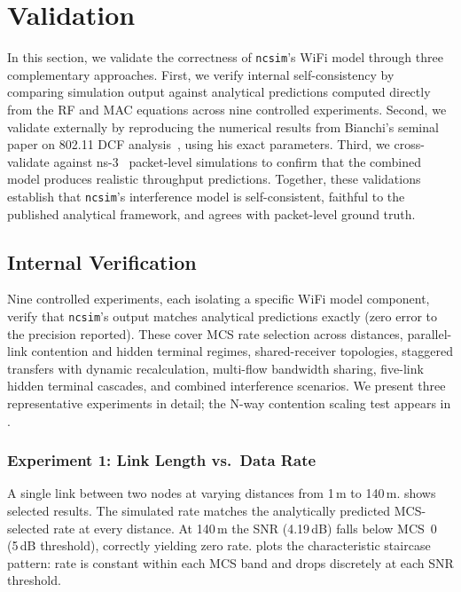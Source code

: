 \documentclass[conference]{IEEEtran}
\newcommand{\ncsim}{\texttt{ncsim}}
\begin{document}
\section{Validation}
\label{sec:validation}

In this section, we validate the correctness of \ncsim{}'s WiFi model
through three complementary approaches.  First, we verify internal
self-consistency by comparing simulation output against analytical
predictions computed directly from the RF and MAC equations across nine
controlled experiments.  Second, we validate externally by reproducing the
numerical results from Bianchi's seminal paper on 802.11 DCF
analysis~\cite{bianchi2000}, using his exact parameters.  Third, we
cross-validate against ns-3~\cite{ns3} packet-level simulations to confirm
that the combined model produces realistic throughput predictions.
Together, these validations establish that \ncsim{}'s interference model is
self-consistent, faithful to the published analytical framework, and
agrees with packet-level ground truth.

\subsection{Internal Verification}
\label{sec:internal_val}

Nine controlled experiments, each isolating a specific WiFi model
component, verify that \ncsim{}'s output matches analytical predictions
exactly (zero error to the precision reported).  These cover MCS rate
selection across distances, parallel-link contention and hidden terminal
regimes, shared-receiver topologies, staggered transfers with dynamic
recalculation, multi-flow bandwidth sharing, five-link hidden terminal
cascades, and combined interference scenarios.  We present three
representative experiments in detail; the N-way contention scaling test
appears in .

\subsubsection{Experiment 1: Link Length vs.\ Data Rate}

A single link between two nodes at varying distances from 1\,m to 140\,m.
 shows selected results.  The simulated rate matches the
analytically predicted MCS-selected rate at every distance.  At 140\,m the
SNR (4.19\,dB) falls below MCS~0 (5\,dB threshold), correctly yielding zero
rate.   plots the characteristic staircase pattern: rate
is constant within each MCS band and drops discretely at each SNR threshold.
\end{document}

